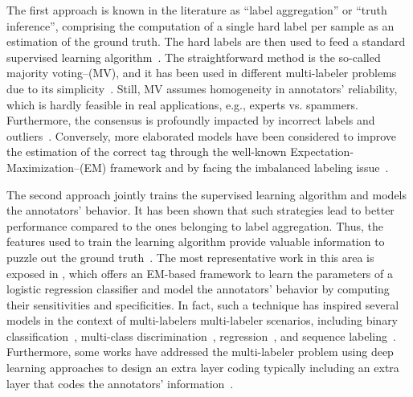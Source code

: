 \documentclass[journal]{IEEEtran}
\newcommand{\comment}[2]{{\color{blue}#1} {\color{red}#2}}
\begin{document}
The first approach is known in the literature as ``label aggregation''
or ``truth inference'', comprising the computation of a single hard
label per sample as an estimation of the ground truth. The
hard labels are then used to feed a standard supervised learning
algorithm~\cite{morales2019scalable}. The straightforward method is the so-called majority voting--(MV), and it has been used in
different multi-labeler problems due to its
simplicity~\cite{zhang2014imbalanced}. Still, MV assumes homogeneity
in annotators' reliability, which is hardly feasible in real
applications, e.g., experts vs. spammers. Furthermore, the consensus
is profoundly impacted by incorrect labels and
outliers~\cite{kara2015modeling}. Conversely, more elaborated models
have been considered to improve the estimation of the correct tag through the well-known Expectation-Maximization--(EM) framework and by facing the imbalanced labeling issue~\cite{dawid1979maximum,zhang2014imbalanced}.

The second approach jointly trains the supervised learning algorithm and models the annotators' behavior. It has been shown that such strategies lead to better performance compared to the ones belonging to label
aggregation. Thus, the features used to train the learning algorithm
provide valuable information to puzzle out the ground
truth~\cite{ruiz2019learning}. The most representative work in this area is exposed in \cite{raykar2010learning}, which offers an EM-based framework to learn the parameters of a logistic regression classifier and model the annotators' behavior by computing their sensitivities and specificities. In fact, such a technique has inspired several models
in the context of \comment{multi-labelers}{multi-labeler} scenarios, including binary
classification~\cite{rodrigues2014gaussian,ruiz2019learning},
multi-class discrimination~\cite{morales2019scalable,gonzalez2015automatic}, regression~\cite{groot2011learning,rodrigues2017learning}, and sequence
labeling~\cite{rodrigues2014sequence}. Furthermore, some works have
addressed the multi-labeler problem using deep learning approaches
\comment{to design an extra layer coding}{typically including an extra
layer that codes} the
annotators' information~\cite{albarqouni2016aggnet,rodrigues2018deep,guan2018said}. 
\end{document}

